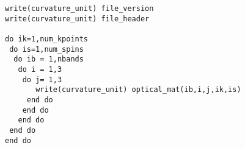 \documentclass[a4paper,11pt,twoside]{book}
\begin{document}
\begin{appendix}
\begin{verbatim}
write(curvature_unit) file_version
write(curvature_unit) file_header

do ik=1,num_kpoints
 do is=1,num_spins
  do ib = 1,nbands
   do i = 1,3
    do j= 1,3
       write(curvature_unit) optical_mat(ib,i,j,ik,is)
     end do
    end do
   end do
 end do
end do
\end{verbatim}

\end{appendix}

%
\end{document}
